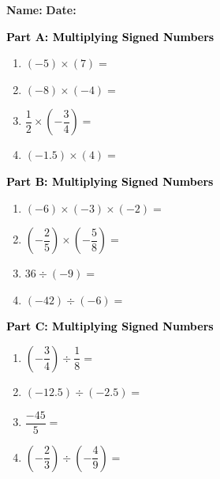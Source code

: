 \documentclass[12pt, letterpaper, fleqn]{article}
\begin{document}
\textbf{Name:} \underline{\hspace{5cm}}
\hfill
\textbf{Date:} \underline{\hspace{3cm}}\\

\begin{tcolorbox}[colback=customteal!20]
\large\textcolor{black}{\textbf{Part A: Multiplying Signed Numbers}}
\end{tcolorbox}

\vspace{3mm}

\begin{enumerate}[itemsep=2.5cm, leftmargin=0.6cm]
\item $(-5) \times (7) =$
\item $(-8) \times (-4) =$
\item $\dfrac{1}{2} \times \left(-\dfrac{3}{4}\right) =$
\item $(-1.5) \times (4) =$
\end{enumerate}

\newpage

\begin{tcolorbox}[colback=customteal!20]
\large\textcolor{black}{\textbf{Part B: Multiplying Signed Numbers}}
\end{tcolorbox}

\vspace{3mm}

\begin{enumerate}[itemsep=2.5cm, leftmargin=0.6cm, resume]
\item $(-6) \times (-3) \times (-2) =$
\item $\left(-\dfrac{2}{5}\right) \times \left(-\dfrac{5}{8}\right) =$
\item $36 \div (-9) =$
\item $(-42) \div (-6) =$
\end{enumerate}

\newpage

\begin{tcolorbox}[colback=customteal!20]
\large\textcolor{black}{\textbf{Part C: Multiplying Signed Numbers}}
\end{tcolorbox}

\vspace{3mm}

\begin{enumerate}[itemsep=2.5cm, leftmargin=0.6cm, resume]
\item $\left(-\dfrac{3}{4}\right) \div \dfrac{1}{8} =$
\item $(-12.5) \div (-2.5) =$
\item $\dfrac{-45}{5} =$
\item $\left(-\dfrac{2}{3}\right) \div \left(-\dfrac{4}{9}\right) =$
\end{enumerate}
\end{document}
